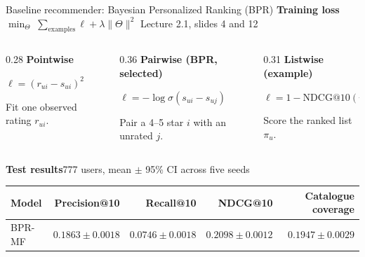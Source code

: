 \documentclass[aspectratio=169,9pt,t]{beamer}
\begin{document}
\begin{frame}{Baseline recommender: Bayesian Personalized Ranking (BPR)}
  \vfill
  \textbf{Training loss}\quad
  $\displaystyle \min_{\Theta}\;\sum_{\text{examples}}\ell+\lambda\lVert\Theta\rVert^2$
  \hfill{\small\color{Muted}Lecture 2.1, slides 4 and 12}\par\medskip
  \begin{columns}[onlytextwidth,T]
    \begin{column}{0.28\textwidth}
      \textbf{Pointwise}\par\smallskip
      $\ell=(r_{ui}-s_{ui})^2$\par\smallskip
      Fit one observed rating $r_{ui}$.
    \end{column}
    \begin{column}{0.36\textwidth}
      \alert{\textbf{Pairwise (BPR, selected)}}\par\smallskip
      $\ell=-\log\sigma(s_{ui}-s_{uj})$\par\smallskip
      Pair a 4--5 star $i$ with an unrated $j$.
    \end{column}
    \begin{column}{0.31\textwidth}
      \textbf{Listwise (example)}\par\smallskip
      $\ell=1-\mathrm{NDCG@10}(\pi_u)$\par\smallskip
      Score the ranked list $\pi_u$.
    \end{column}
  \end{columns}

  \vfill
  \textbf{Test results}\hfill{\small\color{Muted}777 users, mean $\pm$ 95\% CI across five seeds}\par\smallskip
  \begin{tabular*}{\linewidth}{@{\extracolsep{\fill}}lrrrr@{}}
    \toprule
    Model & Precision@10 & Recall@10 & NDCG@10 & Catalogue coverage \\
    \midrule
    BPR-MF & $0.1863\pm0.0018$ & $0.0746\pm0.0018$ & $0.2098\pm0.0012$ & $0.1947\pm0.0029$ \\
    \bottomrule
  \end{tabular*}
\end{frame}
\end{document}
